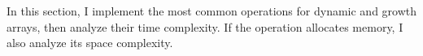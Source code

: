 In this section, I implement the most common operations for dynamic and growth arrays, then analyze their time complexity. If the operation allocates memory, I also analyze its space complexity.